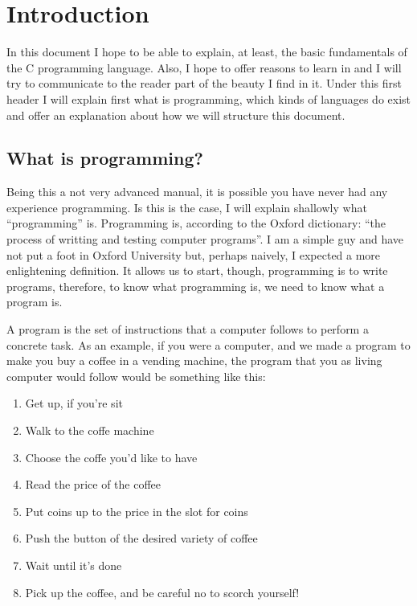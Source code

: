 \documentclass[a4paper]{article}
\begin{document}
\section{Introduction}
In this document I hope to be able to explain, at least, the basic fundamentals
of the C programming language. Also, I hope to offer reasons to learn in and
I will try to communicate to the reader part of the beauty I find in it.
Under this first header I will explain first what is programming, which kinds
of languages do exist and offer an explanation about how we will structure this
document.

\label{section:queEsLaProgramacion}
\subsection{What is programming?}
Being this a not very advanced manual, it is possible you have never had any
experience programming. Is this is the case, I will explain shallowly what
``programming'' is. Programming is, according to the Oxford dictionary: ``the
process of writting and testing computer programs''. I am a simple guy and
have not put a foot in Oxford University but, perhaps naively, I expected a more
enlightening definition. It allows us to start, though, programming is to write
programs, therefore, to know what programming is, we need to know what a program
is.

A program is the set of instructions that a computer follows to perform a
concrete task. As an example, if you were a computer, and we made a program to
make you buy a coffee in a vending machine, the program that you as living
computer would follow would be something like this:

\begin{enumerate}
    \item Get up, if you're sit
    \item Walk to the coffe machine
    \item Choose the coffe you'd like to have
    \item Read the price of the coffee
    \item Put coins up to the price in the slot for coins
    \item Push the button of the desired variety of coffee
    \item Wait until it's done
    \item Pick up the coffee, and be careful no to scorch yourself!
\end{enumerate}
\end{document}
